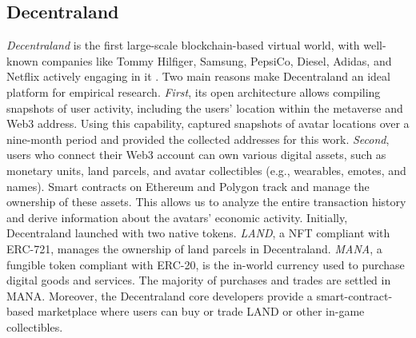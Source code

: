 \documentclass[12pt,a4paper,titlepage,oneside,english]{article}
\begin{document}
\subsection{Decentraland}
\textit{Decentraland} is the first large-scale blockchain-based virtual world, with well-known companies like Tommy Hilfiger, Samsung, PepsiCo, Diesel, Adidas, and Netflix actively engaging in it \citep{metaverse-retailing2023}.\newline
Two main reasons make Decentraland an ideal platform for empirical research.
\textit{First}, its open architecture allows compiling snapshots of user activity, including the users' location within the metaverse and Web3 address. Using this capability, \cite{metaverse-retailing2023} captured snapshots of avatar locations over a nine-month period and provided the collected addresses for this work.\newline
\textit{Second}, users who connect their Web3 account can own various digital assets, such as monetary units, land parcels, and avatar collectibles (e.g., wearables, emotes, and names). Smart contracts on Ethereum and Polygon track and manage the ownership of these assets. This allows us to analyze the entire transaction history and derive information about the avatars' economic activity. \newline
Initially, Decentraland launched with two native tokens. \textit{LAND}, a NFT compliant with ERC-721, manages the ownership of land parcels in Decentraland. \textit{MANA}, a fungible token compliant with ERC-20, is the in-world currency used to purchase digital goods and services. The majority of purchases and trades are settled in MANA. Moreover, the Decentraland core developers provide a smart-contract-based marketplace where users can buy or trade LAND or other in-game collectibles.
\end{document}
